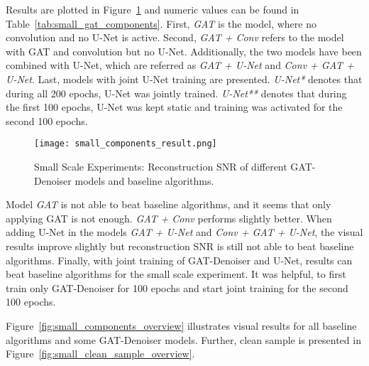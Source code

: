 Results are plotted in Figure~\ref{fig:small_components} and numeric values can be found in Table~\ref{tab:small_gat_components}.
First, \textit{GAT} is the model, where no convolution and no U-Net is active. 
Second, \textit{GAT + Conv} refers to the model with GAT and convolution but no U-Net.
Additionally, the two models have been combined with U-Net, which are referred as 
\textit{GAT + U-Net} and \textit{Conv + GAT + U-Net}.
Last, models with joint U-Net training are presented.
\textit{U-Net*} denotes that during all 200 epochs, U-Net was jointly trained.
\textit{U-Net**} denotes that during the first 100 epochs, U-Net was kept static 
and training was activated for the second 100 epochs.


\begin{figure}[H]
  \centering
  
  \texttt{[image: small\_components\_result.png]}
  \caption{Small Scale Experiments: Reconstruction SNR of different GAT-Denoiser models and baseline algorithms.}
  \label{fig:small_components}
\end{figure}

Model \textit{GAT} is not able to beat baseline algorithms, and it seems that only applying GAT is not enough.
\textit{GAT + Conv} performs slightly better. When adding U-Net in the models \textit{GAT + U-Net}  and \textit{Conv + GAT + U-Net},
the visual results improve slightly but reconstruction SNR is still not able to beat baseline algorithms.
Finally, with joint training of GAT-Denoiser and U-Net, 
results can beat baseline algorithms for the small scale experiment. It was helpful, to first train only GAT-Denoiser for 100 epochs 
and start joint training for the second 100 epochs.

Figure~\ref{fig:small_components_overview} illustrates visual results for all baseline algorithms and some GAT-Denoiser models.
Further, clean sample is presented in Figure~\ref{fig:small_clean_sample_overview}.

